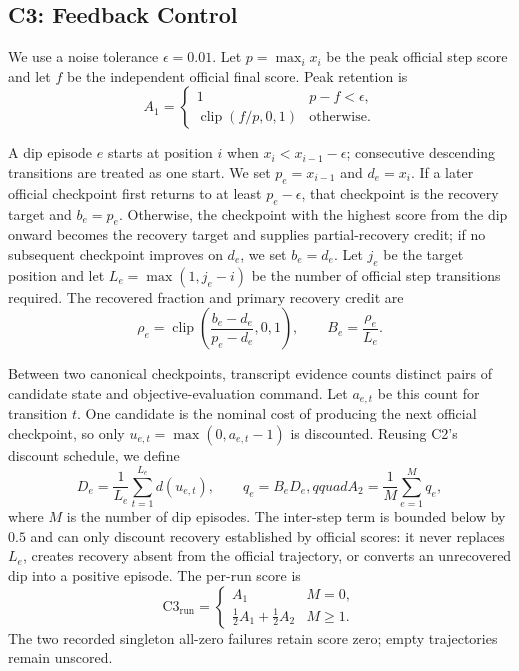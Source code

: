 \subsection{C3: Feedback Control}

We use a noise tolerance $\epsilon=0.01$.  Let $p=\max_i x_i$ be the peak official step score and let $f$ be the independent official final score.  Peak retention is
\[
  A_1=
  \begin{cases}
    1 & p-f<\epsilon,\\[2pt]
    \operatorname{clip}(f/p,0,1) & \text{otherwise}.
  \end{cases}
\]



A dip episode $e$ starts at position $i$ when $x_i<x_{i-1}-\epsilon$; consecutive descending transitions are treated as one start.  We set $p_e=x_{i-1}$ and $d_e=x_i$.  If a later official checkpoint first returns to at least $p_e-\epsilon$, that checkpoint is the recovery target and $b_e=p_e$.  Otherwise, the checkpoint with the highest score from the dip onward becomes the recovery target and supplies partial-recovery credit; if no subsequent checkpoint improves on $d_e$, we set $b_e=d_e$.  Let $j_e$ be the target position and let $L_e=\max(1,j_e-i)$ be the number of official step transitions required.  The recovered fraction and primary recovery credit are
\[
  \rho_e=\operatorname{clip}\!\left(
    \frac{b_e-d_e}{p_e-d_e},0,1
  \right),\qquad
  B_e=\frac{\rho_e}{L_e}.
\]

Between two canonical checkpoints, transcript evidence counts distinct pairs of candidate state and objective-evaluation command.  Let $a_{e,t}$ be this count for transition $t$.  One candidate is the nominal cost of producing the next official checkpoint, so only $u_{e,t}=\max(0,a_{e,t}-1)$ is discounted.  Reusing C2's discount schedule, we define
\[
  D_e=\frac{1}{L_e}\sum_{t=1}^{L_e}d(u_{e,t}),\qquad
  q_e=B_eD_e,qquad
  A_2=\frac{1}{M}\sum_{e=1}^{M}q_e,
\]
where $M$ is the number of dip episodes.  The inter-step term is bounded below by $0.5$ and can only discount recovery established by official scores: it never replaces $L_e$, creates recovery absent from the official trajectory, or converts an unrecovered dip into a positive episode.  The per-run score is
\[
  \mathrm{C3}_{\mathrm{run}}=
  \begin{cases}
    A_1 & M=0,\\[2pt]
    \tfrac12 A_1+\tfrac12 A_2 & M\ge1.
  \end{cases}
\]
The two recorded singleton all-zero failures retain score zero; empty trajectories remain unscored.

